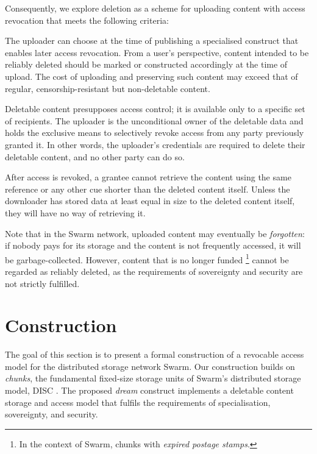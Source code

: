 \documentclass[singlecolumn]{acmart}
\begin{document}
Consequently, we explore deletion as a scheme for uploading content with access revocation that meets the following criteria: 

\begin{labelledlist}
    \item[\emph{specialisation}] The uploader can choose at the time of publishing a specialised construct that enables later access revocation. From a user's perspective, content intended to be reliably deleted should be marked or constructed accordingly at the time of upload. The cost of uploading and preserving such content may exceed that of regular, censorship-resistant but non-deletable content.

    \item[\emph{sovereignty}] Deletable content presupposes access control; it is available only to a specific set of recipients. The uploader is the unconditional owner of the deletable data and holds the exclusive means to selectively revoke access from any party previously granted it. In other words, the uploader's credentials are required to delete their deletable content, and no other party can do so.
%
    \item[\emph{security}] After access is revoked, a grantee cannot retrieve the content using the same reference or any other cue shorter than the deleted content itself. Unless the downloader has stored data at least equal in size to the deleted content itself, they will have no way of retrieving it.
%
\end{labelledlist}

Note that in the Swarm network, uploaded content may eventually be \emph{forgotten}: if nobody pays for its storage and the content is not frequently accessed, it will be garbage-collected. However, content that is no longer funded%
%
\footnote{In the context of Swarm, chunks with \emph{expired postage stamps}.}
%
cannot be regarded as reliably deleted, as the requirements of sovereignty and security are not strictly fulfilled.


\section{Construction}
\label{sec:construction}

The goal of this section is to present a formal construction of a revocable access model for the distributed storage network Swarm. Our construction builds on \emph{chunks}, the fundamental fixed-size storage units of Swarm's distributed storage model, DISC \cite[\S 2]{tron2025BOS}. The proposed \emph{dream} construct implements a deletable content storage and access model that fulfils the requirements of specialisation, sovereignty, and security.
\end{document}
